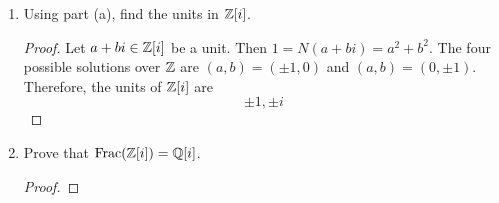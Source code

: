 \documentclass[../psets.tex]{subfiles}
\begin{document}
\begin{enumerate}
\begin{enumerate}[label={(\alph*)}]
\begin{proof}
            Taking the hint, we will begin by computing $N(1)$. Since $1\neq 0$ and $N$ is a positive norm by assumption, $N(1)>0$. Additionally, since $\Z$ is an integral domain, we can use the cancellation law between the following equations.
            \begin{align*}
                N(1\cdot 1) &= N(1)\\
                N(1)N(1) &= N(1)\cdot 1\\
                N(1) &= 1
            \end{align*}
            Having computed $N(1)$, we now begin the argument in earnest.\par
            Suppose first that $a\in R$ is a unit. Then there exists $b\in R$ such that $ab=1$. It follows that
            \begin{align*}
                N(ab) &= N(1)\\
                N(a)N(b) &= 1
            \end{align*}
            Thus, $N(a)=\pm 1$, but since $N(a)\in\Zg$, we must have
            \begin{equation*}
                N(a) = 1
            \end{equation*}
            as desired.\par
            Now suppose that $N(a)=1$. Since $R$ is an ED and $a\neq 0$, we know that there exist $q,r\in R$ such that $1=qa+r$ and $N(a)>N(r)$. But since $N(1)=1$, we must have $N(r)=0$ or $r=0$. Therefore, $1=qa$, so $a$ is a unit, as desired.
        \end{proof}
        \item Using part (a), find the units in $\mathbb{Z}[i]$.
        \begin{proof}
            Let $a+bi\in\mathbb{Z}[i]$ be a unit. Then $1=N(a+bi)=a^2+b^2$. The four possible solutions over $\Z$ are $(a,b)=(\pm 1,0)$ and $(a,b)=(0,\pm 1)$. Therefore, the units of $\mathbb{Z}[i]$ are
            \begin{equation*}
                \boxed{\pm 1,\pm i}
            \end{equation*}
        \end{proof}
        \item Prove that $\operatorname{Frac}(\mathbb{Z}[i])=\mathbb{Q}[i]$.
        \begin{proof}


\end{proof}
\end{enumerate}
\end{enumerate}
\end{document}
